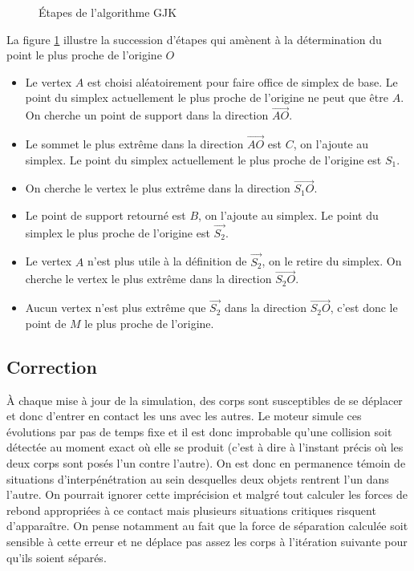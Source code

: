 \begin{figure}
  \centering

  \subfloat[]{  }
  \subfloat[]{  }
  \qquad
  \subfloat[]{  }
  \subfloat[]{  }
  \qquad
  \subfloat[]{  }
  \subfloat[]{  }

  \caption{{\'E}tapes de l'algorithme GJK}
  \label{gjk}
\end{figure}

La figure \ref{gjk} illustre la succession d'étapes qui amènent à la
détermination du point le plus proche de l'origine $O$

\begin{itemize}
\item Le vertex $A$ est choisi aléatoirement pour faire office de
  simplex de base. Le point du simplex actuellement le plus proche de
  l'origine ne peut que être $A$. On cherche un point de support dans
  la direction $\vec{AO}$.
\item Le sommet le plus extrême dans la direction $\vec{AO}$ est $C$,
  on l'ajoute au simplex. Le point du simplex actuellement le plus
  proche de l'origine est $S_1$.
\item On cherche le vertex le plus extrême dans la direction
  $\vec{S_1O}$.
\item Le point de support retourné est $B$, on l'ajoute au simplex. Le
  point du simplex le plus proche de l'origine est $\vec{S_2}$.
\item Le vertex $A$ n'est plus utile à la définition de $\vec{S_2}$,
  on le retire du simplex. On cherche le vertex le plus extrême dans
  la direction $\vec{S_2O}$.
\item Aucun vertex n'est plus extrême que $\vec{S_2}$ dans la
  direction $\vec{S_2O}$, c'est donc le point de $M$ le plus proche de
  l'origine.
\end{itemize}

\subsection{Correction}

\`A chaque mise à jour de la simulation, des corps sont susceptibles
de se déplacer et donc d'entrer en contact les uns avec les autres. Le
moteur simule ces évolutions par pas de temps fixe et il est donc
improbable qu'une collision soit détectée au moment exact o\`u elle se
produit (c'est à dire à l'instant précis o\`u les deux corps sont
posés l'un contre l'autre). On est donc en permanence témoin de
situations d'interpénétration au sein desquelles deux objets rentrent
l'un dans l'autre.  On pourrait ignorer cette imprécision et malgré
tout calculer les forces de rebond appropriées à ce contact mais
plusieurs situations critiques risquent d'apparaître. On pense
notamment au fait que la force de séparation calculée soit sensible à
cette erreur et ne déplace pas assez les corps à l'itération suivante
pour qu'ils soient séparés.

